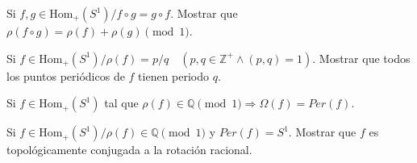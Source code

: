 \begin{ejercicio}
	Si $f, g \in \text{Hom}_+(S^1) / f \circ g = g \circ f$. Mostrar que $\rho(f \circ g) = \rho(f) + \rho(g) \pmod 1$.
\end{ejercicio}

\begin{ejercicio}
	Si $f \in \text{Hom}_+(S^1) / \rho(f) = p/q \quad (p,q \in \mathbb{Z}^+ \land (p,q)=1)$. Mostrar que todos los puntos periódicos de $f$ tienen periodo $q$.
\end{ejercicio}

\begin{ejercicio}
	Si $f \in \text{Hom}_+(S^1)$ tal que $\rho(f) \in \mathbb{Q} \pmod 1 \Rightarrow \Omega(f) = Per(f)$.
\end{ejercicio}

\begin{ejercicio}
	Si $f \in \text{Hom}_+(S^1) / \rho(f) \in \mathbb{Q} \pmod 1$ y $Per(f) = S^1$. Mostrar que $f$ es topológicamente conjugada a la rotación racional.
\end{ejercicio}

